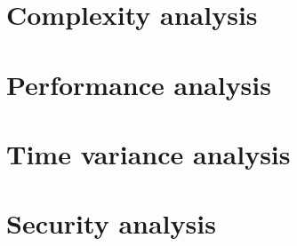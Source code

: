 \section{Complexity analysis}
\section{Performance analysis}
\section{Time variance analysis}
\section{Security analysis}